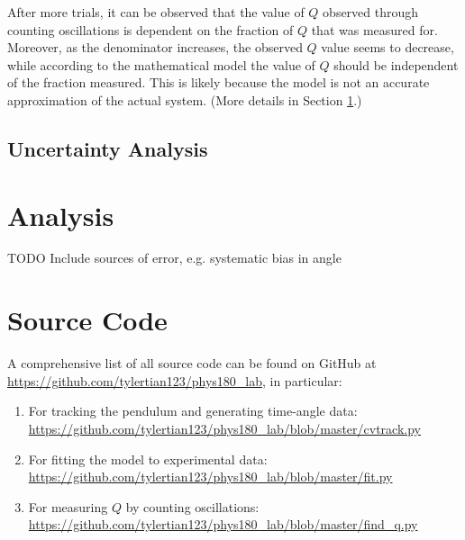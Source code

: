 \documentclass[aps,twocolumn,secnumarabic,nobalancelastpage,amsmath,amssymb,nofootinbib]{revtex4}
\begin{document}
After more trials, it can be observed that the value of \(Q\) observed through counting oscillations is dependent on the
fraction of \(Q\) that was measured for. Moreover, as the denominator increases, the observed \(Q\) value seems to
decrease, while according to the mathematical model the value of \(Q\) should be independent of the fraction measured.
This is likely because the model is not an accurate approximation of the actual system. (More details in Section
\ref{section:analysis}.)

\subsection{Uncertainty Analysis}
\label{section:uncertainty}


\section{Analysis}
\label{section:analysis}

TODO Include sources of error, e.g. systematic bias in angle


\appendix
\section{Source Code}

A comprehensive list of all source code can be found on GitHub at \url{https://github.com/tylertian123/phys180_lab},
in particular:
\label{appendix:code}
\begin{enumerate}
    \item For tracking the pendulum and generating time-angle data: \url{https://github.com/tylertian123/phys180_lab/blob/master/cvtrack.py}
    \item For fitting the model to experimental data: \url{https://github.com/tylertian123/phys180_lab/blob/master/fit.py}
    \item For measuring \(Q\) by counting oscillations: \url{https://github.com/tylertian123/phys180_lab/blob/master/find_q.py}
\end{enumerate}
\end{document}
